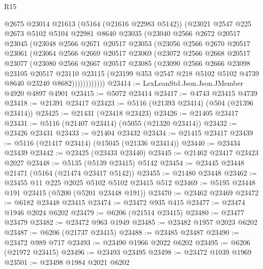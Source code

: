\begin{lexlean}{R15}
\begin{coremodule}
{{{{{{{{{{{          @2675
          @23014
          @21613
          (@5164 (@21616 @22983 @5142))
          (@23021
            @2547
            @225
            @2673
            @5102
            @5104
            @22981
            @8640
            @23035
            (@23040
              @2566
              @2672
              @20517
              @23045
              (@23048
                @2566
                @2671
                @20517
                @23053
                (@23056
                  @2566
                  @2670
                  @20517
                  @23061
                  (@23064
                    @2566
                    @2669
                    @20517
                    @23069
                    (@23072
                      @2566
                      @2668
                      @20517
                      @23077
                      (@23080
                        @2566
                        @2667
                        @20517
                        @23085
                        (@23090
                          @2566
                          @2666
                          @23098
                          @23105
                          @20517
                          @23110
                          @23115
                          (@23199 @353 @2547 @218 @5102 @5102 @4739 @8640 @23240 @8682))))))))))))
@23414 := LexLeanStd.Json.Json.JMember @4920 @4897 @4901
@23415 := @5072 @23414
@23417 := @4743 @23415 @4739
@23418 := @21391 @23417
@23423 := @5116 (@21393 @23414) (@504 (@21396 @23414))
@23425 := @21431 (@23418 @23423)
@23426 := @21405 @23417
@23431 := @5116 (@21407 @23414) (@5055 (@21320 @23414))
@23432 := @23426 @23431
@23433 := @21404 @23432
@23434 := @21415 @23417
@23439 := @5116 (@21417 @23414) (@15045 (@21336 @23414))
@23440 := @23434 @23439
@23442 := @23425 (@23433 @23440)
@23445 := @21462 @23417 @23423 @2027
@23448 := @5135 (@5139 @23415) @5142
@23454 := @23445 @23448 @21471 (@5164 (@21474 @23417 @5142))
@23455 := @21480 @23448
@23462 := @23455 @11 @225 @2025 @5102 @5102 @23415 @512
@23469 := @5195 @23448 @191 @23415 (@5200 (@5201 @23448 @191))
@23470 := @23462 @23469
@23472 := @6182 @23448 @23415
@23474 := @23472 @935 @415
@23477 := @23474 @1946 @2024 @6202
@23479 := @6206 (@21514 @23415)
@23480 := @23477 @23479
@23482 := @23472 @963 @1949
@23485 := @23482 @1957 @2023 @6202
@23487 := @6206 (@21737 @23415)
@23488 := @23485 @23487
@23490 := @23472 @989 @717
@23493 := @23490 @1966 @2022 @6202
@23495 := @6206 (@21972 @23415)
@23496 := @23493 @23495
@23498 := @23472 @1039 @1969
@23501 := @23498 @1984 @2021 @6202
}}}}}}}}}}}
\end{coremodule}
\end{lexlean}
